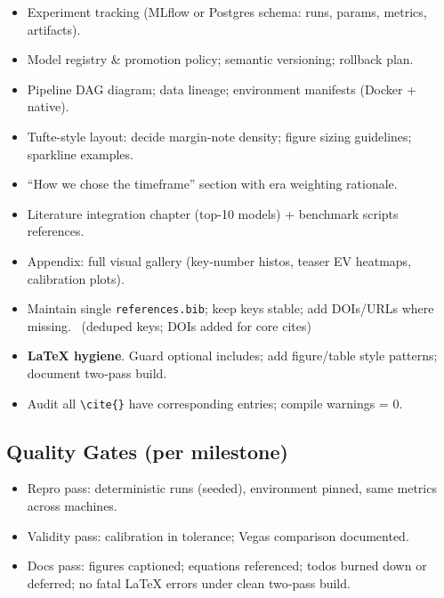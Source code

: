 \begin{itemize}
  \item {} Experiment tracking (MLflow or Postgres schema: runs, params, metrics, artifacts).
  \item {} Model registry \& promotion policy; semantic versioning; rollback plan.
  \item {} Pipeline DAG diagram; data lineage; environment manifests (Docker + native).
\end{itemize}

\begin{itemize}
  \item {} Tufte-style layout: decide margin-note density; figure sizing guidelines; sparkline examples.
  \item {} “How we chose the timeframe” section with era weighting rationale.
  \item {} Literature integration chapter (top-10 models) + benchmark scripts references.
  \item {} Appendix: full visual gallery (key-number histos, teaser EV heatmaps, calibration plots).
\end{itemize}

\begin{itemize}
  \item {} Maintain single \texttt{references.bib}; keep keys stable; add DOIs/URLs where missing. \done\ (deduped keys; DOIs added for core cites)
  \item {} \textbf{LaTeX hygiene}. Guard optional includes; add figure/table style patterns; document two‑pass build. \done
  \item {} Audit all \texttt{\textbackslash cite\{\}} have corresponding entries; compile warnings = 0.
\end{itemize}

\subsection*{Quality Gates (per milestone)}
\begin{itemize}
  \item Repro pass: deterministic runs (seeded), environment pinned, same metrics across machines.
  \item Validity pass: calibration in tolerance; Vegas comparison documented.
  \item Docs pass: figures captioned; equations referenced; todos burned down or deferred; no fatal LaTeX errors under clean two‑pass build.
\end{itemize}

\endgroup

